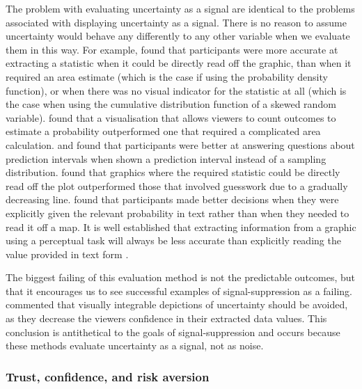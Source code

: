\documentclass[
  12pt]{article}
\begin{document}
The problem with evaluating uncertainty as a signal are identical to the
problems associated with displaying uncertainty as a signal. There is no
reason to assume uncertainty would behave any differently to any other
variable when we evaluate them in this way. For example,
\citet{Ibrekk1987} found that participants were more accurate at
extracting a statistic when it could be directly read off the graphic,
than when it required an area estimate (which is the case if using the
probability density function), or when there was no visual indicator for
the statistic at all (which is the case when using the cumulative
distribution function of a skewed random variable). \citet{Hullman2015}
found that a visualisation that allows viewers to count outcomes to
estimate a probability outperformed one that required a complicated area
calculation. \citet{Hofman2020} and \citet{Zhang2022} found that
participants were better at answering questions about prediction
intervals when shown a prediction interval instead of a sampling
distribution. \citet{Gschwandtnei2016} found that graphics where the
required statistic could be directly read off the plot outperformed
those that involved guesswork due to a gradually decreasing line.
\citet{Cheong2016} found that participants made better decisions when
they were explicitly given the relevant probability in text rather than
when they needed to read it off a map. It is well established that
extracting information from a graphic using a perceptual task will
always be less accurate than explicitly reading the value provided in
text form \citep{Cleveland1984}.

The biggest failing of this evaluation method is not the predictable
outcomes, but that it encourages us to see successful examples of
signal-suppression as a failing. \citet{Blenkinsop2000} commented that
visually integrable depictions of uncertainty should be avoided, as they
decrease the viewers confidence in their extracted data values. This
conclusion is antithetical to the goals of signal-suppression and occurs
because these methods evaluate uncertainty as a signal, not as noise.

\subsubsection{Trust, confidence, and risk
aversion}\label{trust-confidence-and-risk-aversion}
\end{document}
